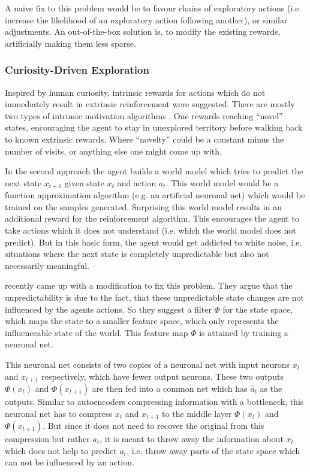 A naive fix to this problem would be to favour chains of exploratory actions (i.e. increase the likelihood of an exploratory action following another), or similar adjustments. An out-of-the-box solution is, to modify the existing rewards, artificially making them less sparse. 

\subsubsection{Curiosity-Driven Exploration}

Inspired by human curiosity, intrinsic rewards for actions which do not immediately result in extrinsic reinforcement were suggested. There are mostly two types of intrinsic motivation algorithms \parencite{pathakCuriosityDrivenExplorationSelfSupervised2017}. One rewards reaching ``novel'' states, encouraging the agent to stay in unexplored territory before walking back to known extrinsic rewards. Where ``novelty'' could be a constant minus the number of visits, or anything else one might come up with. 

In the second approach the agent builds a world model which tries to predict the next state \(x_{t+1}\) given state \(x_t\) and action \(a_t\). This world model would be a function approximation algorithm (e.g. an artificial neuronal net) which would be trained on the samples generated. Surprising this world model results in an additional reward for the reinforcement algorithm. This encourages the agent to take actions which it does not understand (i.e. which the world model does not predict). But in this basic form, the agent would get addicted to white noise, i.e. situations where the next state is completely unpredictable but also not necessarily meaningful.

\textcite{pathakCuriosityDrivenExplorationSelfSupervised2017}
recently came up with a modification to fix this problem. They argue that the unpredictability is due to the fact, that these unpredictable state changes are not influenced by the agents actions. So they suggest a filter \(\Phi\) for the state space, which maps the state to a smaller feature space, which only represents the influenceable state of the world. This feature map \(\Phi\) is attained by training a neuronal net. 

This neuronal net consists of two copies of a neuronal net with input neurons \(x_t\) and \(x_{t+1}\) respectively, which have fewer output neurons. These two outputs \(\Phi(x_t)\) and \(\Phi(x_{t+1})\) are then fed into a common net which has \(\hat{a}_t\) as the outputs. Similar to autoencoders compressing information with a bottleneck, this neuronal net has to compress \(x_t\) and \(x_{t+1}\) to the middle layer \(\Phi(x_t)\) and \(\Phi(x_{t+1})\). But since it does not need to recover the original from this compression but rather \(a_t\), it is meant to throw away the information about \(x_t\) which does not help to predict \(a_t\), i.e. throw away parts of the state space which can not be influenced by an action.


